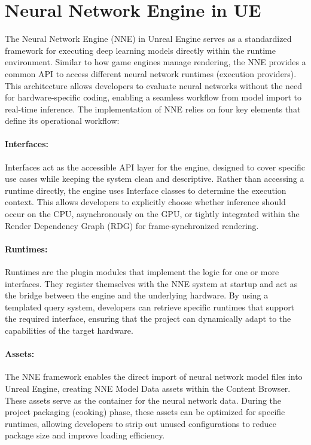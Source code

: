 \documentclass[12pt,a4paper]{report}
\begin{document}
\section{Neural Network Engine in UE}
The Neural Network Engine (NNE) in Unreal Engine serves as a standardized framework for executing deep learning models directly within the runtime environment. Similar to how game engines manage rendering, the NNE provides a common API to access different neural network runtimes (execution providers). This architecture allows developers to evaluate neural networks without the need for hardware-specific coding, enabling a seamless workflow from model import to real-time inference. The implementation of NNE relies on four key elements that define its operational workflow:

\paragraph{Interfaces:} Interfaces act as the accessible API layer for the engine, designed to cover specific use cases while keeping the system clean and descriptive. Rather than accessing a runtime directly, the engine uses Interface classes to determine the execution context. This allows developers to explicitly choose whether inference should occur on the CPU, asynchronously on the GPU, or tightly integrated within the Render Dependency Graph (RDG) for frame-synchronized rendering.
\paragraph{Runtimes:} Runtimes are the plugin modules that implement the logic for one or more interfaces. They register themselves with the NNE system at startup and act as the bridge between the engine and the underlying hardware. By using a templated query system, developers can retrieve specific runtimes that support the required interface, ensuring that the project can dynamically adapt to the capabilities of the target hardware.
\paragraph{Assets:} The NNE framework enables the direct import of neural network model files into Unreal Engine, creating NNE Model Data assets within the Content Browser. These assets serve as the container for the neural network data. During the project packaging (cooking) phase, these assets can be optimized for specific runtimes, allowing developers to strip out unused configurations to reduce package size and improve loading efficiency.
\end{document}
